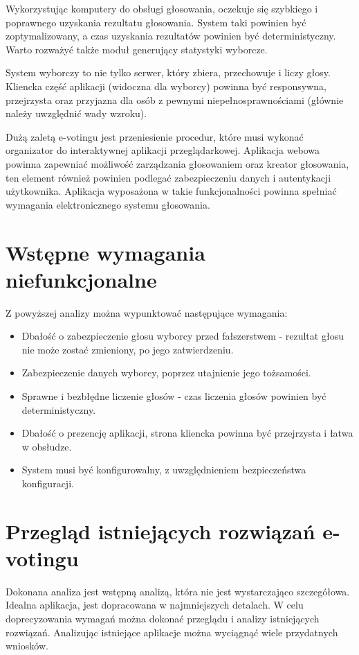 \documentclass{report}
\begin{document}
Wykorzystując komputery do obsługi głosowania, oczekuje się szybkiego i poprawnego uzyskania rezultatu głosowania. System taki powinien być zoptymalizowany, a czas uzyskania rezultatów powinien być deterministyczny. Warto rozważyć także moduł generujący statystyki wyborcze.

System wyborczy to nie tylko serwer, który zbiera, przechowuje i liczy głosy. Kliencka część aplikacji (widoczna dla wyborcy) powinna być responsywna, przejrzysta oraz przyjazna dla osób z pewnymi niepełnosprawnościami (głównie należy uwzględnić wady wzroku).

Dużą zaletą e-votingu jest przeniesienie procedur, które musi wykonać organizator do interaktywnej aplikacji przeglądarkowej. Aplikacja webowa powinna zapewniać możliwość zarządzania głosowaniem oraz kreator głosowania, ten element również powinien podlegać zabezpieczeniu danych i autentykacji użytkownika. Aplikacja wyposażona w takie funkcjonalności powinna spełniać wymagania elektronicznego systemu głosowania.

\section{Wstępne wymagania niefunkcjonalne}
Z powyższej analizy można wypunktować następujące wymagania:
\begin{itemize}

\item Dbałość o zabezpieczenie głosu wyborcy przed fałszerstwem - rezultat głosu nie może zostać zmieniony, po jego zatwierdzeniu.

\item Zabezpieczenie danych wyborcy, poprzez utajnienie jego tożsamości.

\item Sprawne i bezbłędne liczenie głosów - czas liczenia głosów powinien być deterministyczny.

\item Dbałość o prezencję aplikacji, strona kliencka powinna być przejrzysta i łatwa w obsłudze.

\item System musi być konfigurowalny, z uwzględnieniem bezpieczeństwa konfiguracji.
\end{itemize}


\section{Przegląd istniejących rozwiązań e-votingu}
Dokonana analiza jest wstępną analizą, która nie jest wystarczająco szczegółowa. Idealna aplikacja, jest dopracowana w najmniejszych detalach. W celu doprecyzowania wymagań można dokonać przeglądu i analizy istniejących rozwiązań. Analizując istniejące aplikacje można wyciągnąć wiele przydatnych wniosków.
\end{document}
